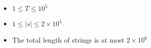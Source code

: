 \begin{itemize}
\tightlist
\item $1 \leq T \leq 10^5$
\item $1 \leq |s| \leq 2\times 10^5$
\item The total length of strings is at most $2 \times 10^6$
\end{itemize}
